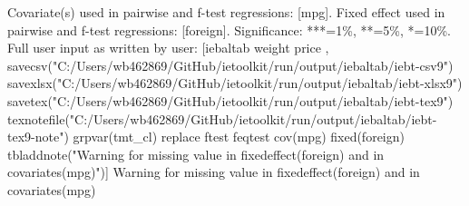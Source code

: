 Covariate(s) used in pairwise and f-test regressions: [mpg]. Fixed effect used in pairwise and f-test regressions: [foreign]. Significance: ***=1\%, **=5\%, *=10\%. Full user input as written by user: [iebaltab weight price , savecsv("C:/Users/wb462869/GitHub/ietoolkit/run/output/iebaltab/iebt-csv9") savexlsx("C:/Users/wb462869/GitHub/ietoolkit/run/output/iebaltab/iebt-xlsx9") savetex("C:/Users/wb462869/GitHub/ietoolkit/run/output/iebaltab/iebt-tex9") texnotefile("C:/Users/wb462869/GitHub/ietoolkit/run/output/iebaltab/iebt-tex9-note") grpvar(tmt\_cl) replace ftest feqtest cov(mpg) fixed(foreign) tbladdnote("Warning for missing value in fixedeffect(foreign) and in covariates(mpg)")] Warning for missing value in fixedeffect(foreign) and in covariates(mpg)
